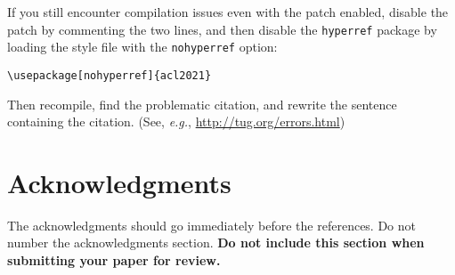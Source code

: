 \documentclass[11pt,a4paper]{article}
\begin{document}
If you still encounter compilation issues even with the patch enabled, disable the patch by commenting the two lines, and then disable the \texttt{\small hyperref} package by loading the style file with the \texttt{\small nohyperref} option:

\noindent
{\small\verb|\usepackage[nohyperref]{acl2021}|}

\noindent
Then recompile, find the problematic citation, and rewrite the sentence containing the citation. (See, {\em e.g.}, \url{http://tug.org/errors.html})

\section*{Acknowledgments}

The acknowledgments should go immediately before the references. Do not number the acknowledgments section.
\textbf{Do not include this section when submitting your paper for review.}




\end{document}
